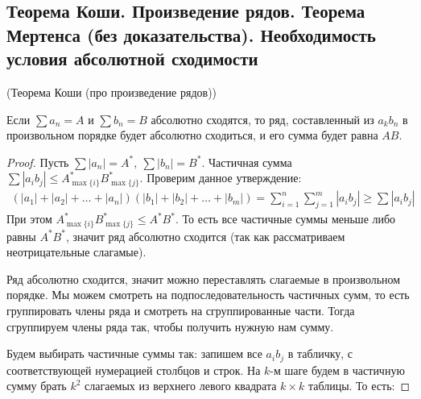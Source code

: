 \subsection{Теорема Коши. Произведение рядов. Теорема Мертенса (без доказательства). Необходимость условия абсолютной сходимости}
\begin{theorem}
    (Теорема Коши (про произведение рядов)) 
    
    Если $\sum a_n = A$ и $\sum b_n = B$ абсолютно сходятся, то
    ряд, составленный из $a_kb_n$ в произвольном порядке будет абсолютно сходиться, и его сумма будет равна $AB$.
\end{theorem}
\begin{proof}
    Пусть $\sum |a_n| = A^*,\ \sum|b_n| = B^*$. Частичная сумма $\sum |a_i b_j| \leq A^*_{\max\{i\}}B^*_{\max\{j\}}$. Проверим данное утверждение:
    \begin{gather*}
        (|a_1| + |a_2| + \ldots + |a_n|)(|b_1| + |b_2|+\ldots + |b_m|) = \sum \limits_{i=1}^n \sum \limits_{j=1}^m |a_i b_j| \geq \sum|a_i b_j|
    \end{gather*}
    При этом $A^*_{\max\{i\}} B^*_{\max\{j\}} \leqslant A^* B^*$. То есть все частичные суммы 
    меньше либо равны $A^*B^*$, значит ряд абсолютно сходится (так как рассматриваем неотрицательные слагамые).

    Ряд абсолютно сходится, значит можно переставлять слагаемые в произвольном порядке.
    Мы можем смотреть на подпоследовательность частичных сумм, то есть группировать
    члены ряда и смотреть на сгруппированные части. Тогда сгруппируем члены ряда так, 
    чтобы получить нужную нам сумму.

    Будем выбирать частичные суммы так: запишем все $a_ib_j$ в табличку,
    с соответствующей нумерацией столбцов и строк. На $k$-м шаге
    будем в частичную сумму брать $k^2$ слагаемых из верхнего
    левого квадрата $k\times k$ таблицы. То есть:
      

\end{proof}

